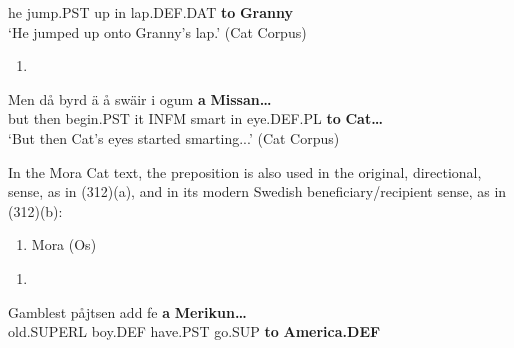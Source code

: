 he  jump.PST  up  in  lap.DEF.DAT  \textbf{to} \textbf{Granny}\\ %


‘He jumped up onto Granny’s lap.’ (Cat Corpus)
\z


\begin{enumerate} %
\item 
\end{enumerate} %
\ea\label{}
\gll Men  då  byrd  ä  å  swäir  i  ogum  \textbf{a} \textbf{Missan…}\\


but  then  begin.PST  it  INFM  smart  in  eye.DEF.PL  \textbf{to} \textbf{Cat…}\\ %


‘But then Cat’s eyes started smarting...’ (Cat Corpus)
\z


In the Mora Cat text, the preposition is also used in the original, directional, sense, as in (312)(a), and in its modern Swedish beneficiary/recipient sense, as in (312)(b):

\begin{enumerate} %
\item 
\label{bkm:Ref135470190}Mora (Os)

\end{enumerate} %
\setcounter{listLFOxcviiileveli}{0}
\begin{enumerate} %
\item 
\end{enumerate} %
\ea\label{}
\gll Gamblest  påjtsen  add  fe  \textbf{a} \textbf{Merikun…}\\


old.SUPERL  boy.DEF  have.PST  go.SUP  \textbf{to} \textbf{America.DEF}\\ %


